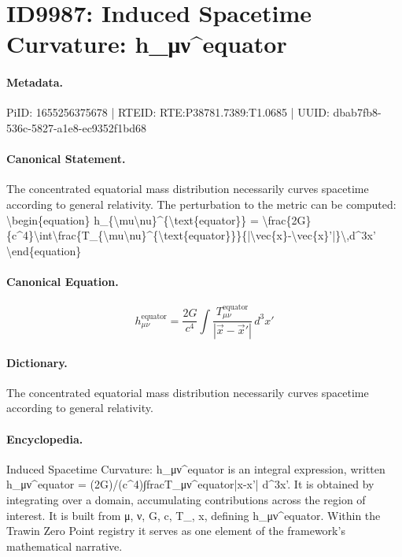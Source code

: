 \section*{ID9987: Induced Spacetime Curvature: h\_μν\textasciicircum{}equator}
\paragraph{Metadata.}
PiID: 1655256375678 | RTEID: RTE:P38781.7389:T1.0685 | UUID: dbab7fb8-536c-5827-a1e8-ec9352f1bd68

\paragraph{Canonical Statement.}
The concentrated equatorial mass distribution necessarily curves spacetime according to general relativity. The perturbation to the metric can be computed: \textbackslash{}begin\{equation\} h\_\{\textbackslash{}mu\textbackslash{}nu\}\textasciicircum{}\{\textbackslash{}text\{equator\}\} = \textbackslash{}frac\{2G\}\{c\textasciicircum{}4\}\textbackslash{}int\textbackslash{}frac\{T\_\{\textbackslash{}mu\textbackslash{}nu\}\textasciicircum{}\{\textbackslash{}text\{equator\}\}\}\{|\textbackslash{}vec\{x\}-\textbackslash{}vec\{x\}'|\}\textbackslash{},d\textasciicircum{}3x' \textbackslash{}end\{equation\}

\paragraph{Canonical Equation.}
\[
h_{\mu\nu}^{\text{equator}} = \frac{2G}{c^4}\int\frac{T_{\mu\nu}^{\text{equator}}}{|\vec{x}-\vec{x}'|}\,d^3x'
\]

\paragraph{Dictionary.}
The concentrated equatorial mass distribution necessarily curves spacetime according to general relativity.

\paragraph{Encyclopedia.}
Induced Spacetime Curvature: h\_μν\textasciicircum{}equator is an integral expression, written h\_μν\textasciicircum{}equator = (2G)/(c\textasciicircum{}4)∫fracT\_μν\textasciicircum{}equator|x-x'| d\textasciicircum{}3x'. It is obtained by integrating over a domain, accumulating contributions across the region of interest. It is built from μ, ν, G, c, T\_, x, defining h\_μν\textasciicircum{}equator. Within the Trawin Zero Point registry it serves as one element of the framework's mathematical narrative.
